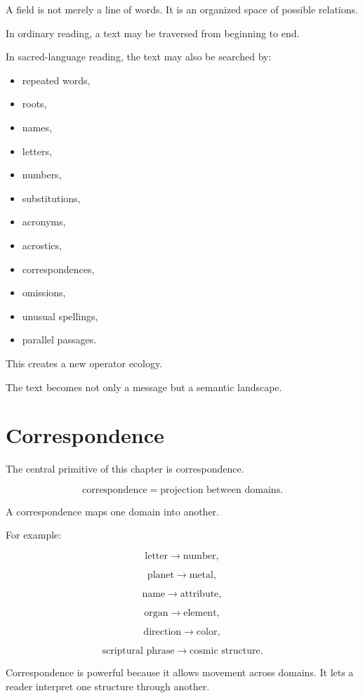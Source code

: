 \documentclass[11pt]{book}
\begin{document}
A field is not merely a line of words. It is an organized space of possible relations.

In ordinary reading, a text may be traversed from beginning to end.

In sacred-language reading, the text may also be searched by:

\begin{itemize}
    \item repeated words,
    \item roots,
    \item names,
    \item letters,
    \item numbers,
    \item substitutions,
    \item acronyms,
    \item acrostics,
    \item correspondences,
    \item omissions,
    \item unusual spellings,
    \item parallel passages.
\end{itemize}

This creates a new operator ecology.

The text becomes not only a message but a semantic landscape.

\section{Correspondence}

The central primitive of this chapter is correspondence.

\[
\text{correspondence} = \text{projection between domains}.
\]

A correspondence maps one domain into another.

For example:

\[
\text{letter} \rightarrow \text{number},
\]

\[
\text{planet} \rightarrow \text{metal},
\]

\[
\text{name} \rightarrow \text{attribute},
\]

\[
\text{organ} \rightarrow \text{element},
\]

\[
\text{direction} \rightarrow \text{color},
\]

\[
\text{scriptural phrase} \rightarrow \text{cosmic structure}.
\]

Correspondence is powerful because it allows movement across domains. It lets a reader interpret one structure through another.
\end{document}
